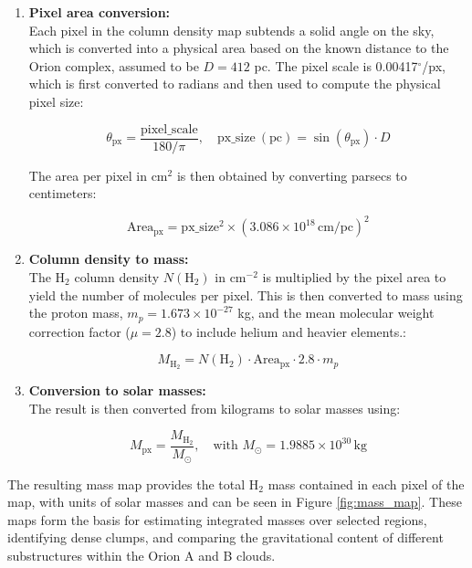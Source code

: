 \begin{enumerate}
    \item \textbf{Pixel area conversion:} \\
    Each pixel in the column density map subtends a solid angle on the sky, which is converted into a physical area based on the known distance to the Orion complex, assumed to be $D = 412$ pc. The pixel scale is 0.00417$^\circ$/px, which is first converted to radians and then used to compute the physical pixel size:

    \[
    \theta_{\mathrm{px}} = \frac{\mathrm{pixel\_scale}}{180/\pi}, \quad 
    \mathrm{px\_size\ (pc)} = \sin(\theta_{\mathrm{px}}) \cdot D
    \]

    The area per pixel in cm$^2$ is then obtained by converting parsecs to centimeters:

    \[
    \mathrm{Area_{px}} = \mathrm{px\_size}^2 \times (3.086 \times 10^{18}\,\mathrm{cm/pc})^2
    \]

    \item \textbf{Column density to mass:} \\
    The H$_2$ column density $N(\mathrm{H}_2)$ in cm$^{-2}$ is multiplied by the pixel area to yield the number of molecules per pixel. This is then converted to mass using the proton mass, $m_p = 1.673 \times 10^{-27}$ kg, and the mean molecular weight correction factor ($\mu = 2.8$) to include helium and heavier elements.:

    \[
    M_{\mathrm{H}_2} = N(\mathrm{H}_2) \cdot \mathrm{Area_{px}} \cdot 2.8 \cdot m_p
    \]

    \item \textbf{Conversion to solar masses:} \\
    The result is then converted from kilograms to solar masses using:

    \[
    M_{\mathrm{px}} = \frac{M_{\mathrm{H}_2}}{M_\odot}, \quad \text{with } M_\odot = 1.9885 \times 10^{30}\, \mathrm{kg}
    \]
\end{enumerate}

The resulting mass map provides the total H$_2$ mass contained in each pixel of the map, with units of solar masses and can be seen in Figure \ref{fig:mass_map}. These maps form the basis for estimating integrated masses over selected regions, identifying dense clumps, and comparing the gravitational content of different substructures within the Orion A and B clouds.

